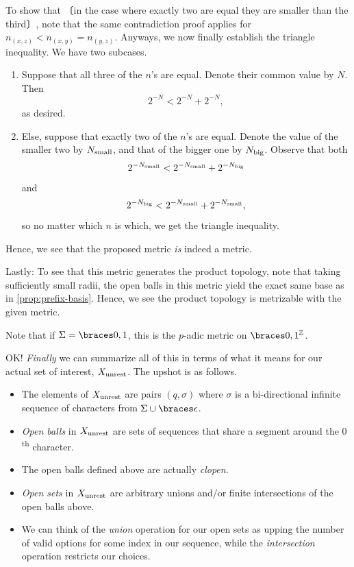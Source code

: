 \documentclass{fkpaper}
\newcommand{\np}[1]{\hspace{-.55em}〔#1〕\hspace{-.55em}}
\begin{document}
\begin{multicols}{2}
\begin{sproof}
  To show that \np{in the case where exactly two are equal they are
    smaller than the third}, note that the same contradiction proof
  applies for $n_{(x,z)} < n_{(x,y)} = n_{(y,z)}$. Anyways, we now
  finally establish the triangle inequality. We have two subcases.
  \begin{enumerate}
    \item Suppose that all three of the $n$'s are equal. Denote their
      common value by $N$. Then
      \[
      2^{-N} < 2^{-N} + 2^{-N},
      \]
      as desired.
    \item Else, suppose that exactly two of the $n$'s are equal.
      Denote the value of the smaller two by $N_{\rm small}$, and that
      of the bigger one by $N_{\rm big}$. Observe that both
      \[
      2^{-N_{\rm small}} < 2^{-N_{\rm small}} + 2^{-N_{\rm big}}
      \]
      and
      \[
      2^{-N_{\rm big}} < 2^{-N_{\rm small}} + 2^{-N_{\rm small}},
      \]
      so no matter which $n$ is which, we get the triangle inequality.
  \end{enumerate}
  Hence, we see that the proposed metric \emph{is} indeed a metric.

  Lastly: To see that this metric generates the product topology, note
  that taking sufficiently small radii, the open balls in this metric
  yield the exact same base as in \cref{prop:prefix-basis}. Hence, we
  see the product topology is metrizable with the given metric.
\end{sproof}
\begin{remark}
  Note that if $\Sigma = \set{0,1}$, this is the $p$-adic metric on
  $\set{0,1}^{\ZZ}$.
\end{remark}
OK! \emph{Finally} we can summarize all of this in terms of what it
means for our actual set of interest, $X_{\rm unrest}$. The upshot is
as follows.
\begin{itemize}
  \item The elements of $X_{\rm unrest}$ are pairs $(q, \sigma)$ where
    $\sigma$ is a bi-directional infinite sequence of characters from
    $\Sigma \cup \set{\epsilon}$.
  \item \emph{Open balls} in $X_{\rm unrest}$ are sets of sequences
    that share a segment around the $0$\textsuperscript{th} character.
  \item The open balls defined above are actually \emph{clopen}.
  \item \emph{Open sets} in $X_{\rm unrest}$ are arbitrary unions
    and/or finite intersections of the open balls above.
  \item We can think of the \emph{union} operation for our open sets
    as upping the number of valid options for some index in our
    sequence, while the \emph{intersection} operation restricts our
    choices.
\end{itemize}



\end{multicols}
\end{document}

